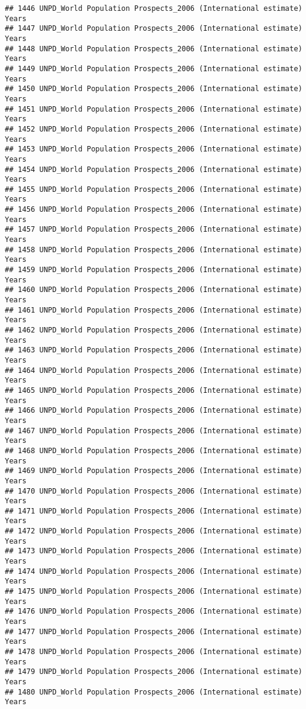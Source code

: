 \documentclass[]{article}
\begin{document}
\begin{verbatim}
## 1446 UNPD_World Population Prospects_2006 (International estimate) Years
## 1447 UNPD_World Population Prospects_2006 (International estimate) Years
## 1448 UNPD_World Population Prospects_2006 (International estimate) Years
## 1449 UNPD_World Population Prospects_2006 (International estimate) Years
## 1450 UNPD_World Population Prospects_2006 (International estimate) Years
## 1451 UNPD_World Population Prospects_2006 (International estimate) Years
## 1452 UNPD_World Population Prospects_2006 (International estimate) Years
## 1453 UNPD_World Population Prospects_2006 (International estimate) Years
## 1454 UNPD_World Population Prospects_2006 (International estimate) Years
## 1455 UNPD_World Population Prospects_2006 (International estimate) Years
## 1456 UNPD_World Population Prospects_2006 (International estimate) Years
## 1457 UNPD_World Population Prospects_2006 (International estimate) Years
## 1458 UNPD_World Population Prospects_2006 (International estimate) Years
## 1459 UNPD_World Population Prospects_2006 (International estimate) Years
## 1460 UNPD_World Population Prospects_2006 (International estimate) Years
## 1461 UNPD_World Population Prospects_2006 (International estimate) Years
## 1462 UNPD_World Population Prospects_2006 (International estimate) Years
## 1463 UNPD_World Population Prospects_2006 (International estimate) Years
## 1464 UNPD_World Population Prospects_2006 (International estimate) Years
## 1465 UNPD_World Population Prospects_2006 (International estimate) Years
## 1466 UNPD_World Population Prospects_2006 (International estimate) Years
## 1467 UNPD_World Population Prospects_2006 (International estimate) Years
## 1468 UNPD_World Population Prospects_2006 (International estimate) Years
## 1469 UNPD_World Population Prospects_2006 (International estimate) Years
## 1470 UNPD_World Population Prospects_2006 (International estimate) Years
## 1471 UNPD_World Population Prospects_2006 (International estimate) Years
## 1472 UNPD_World Population Prospects_2006 (International estimate) Years
## 1473 UNPD_World Population Prospects_2006 (International estimate) Years
## 1474 UNPD_World Population Prospects_2006 (International estimate) Years
## 1475 UNPD_World Population Prospects_2006 (International estimate) Years
## 1476 UNPD_World Population Prospects_2006 (International estimate) Years
## 1477 UNPD_World Population Prospects_2006 (International estimate) Years
## 1478 UNPD_World Population Prospects_2006 (International estimate) Years
## 1479 UNPD_World Population Prospects_2006 (International estimate) Years
## 1480 UNPD_World Population Prospects_2006 (International estimate) Years

\end{verbatim}
\end{document}
